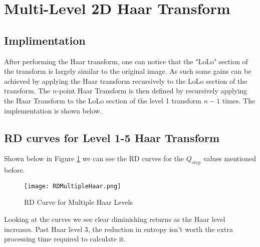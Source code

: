 \section{Multi-Level 2D Haar Transform}
\subsection{Implimentation}
After performing the Haar transform, one can notice that the "LoLo" section of the transform is largely similar to the original image. As such some gains can be achieved by applying the Haar transform recursively to the LoLo section of the transform. The $n$-point Haar Transform is then defined by recursively applying the Haar Transform to the LoLo section of the level 1 transform $n-1$ times. The implementation is shown below.


\subsection{RD curves for Level 1-5 Haar Transform}
Shown below in Figure \ref{fig:RDMultipleHaar} we can see the RD curves for the $Q_{step}$ values mentioned before.

\begin{figure}[!h]
    \texttt{[image: RDMultipleHaar.png]}
    \centering
    \caption{RD Curve for Multiple Haar Levels}
    \label{fig:RDMultipleHaar}
\end{figure}

\noindent Looking at the curves we see clear diminishing returns as the Haar level increases. Past Haar level 3, the reduction in entropy isn't worth the extra processing time required to calculate it.